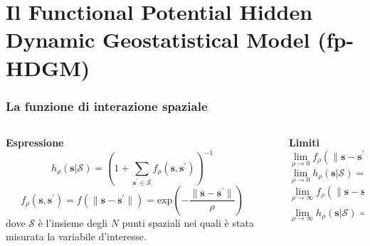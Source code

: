 \section[Il modello fp-HDGM]{Il Functional Potential Hidden Dynamic Geostatistical Model (fp-HDGM)}

\begin{frame}
	\frametitle{La funzione di interazione spaziale}
	\centering
	
	\begin{columns}[T]
		
		\begin{column}[t]{0.48\linewidth}
			\textbf{Espressione}
			\begin{equation*}
				h_\rho(\mathbf{s}|\mathcal{S}) = \left(1 + \sum_{\mathbf{s}^\prime\in\mathcal{S}}f_\rho(\mathbf{s}, \mathbf{s}^\prime)\right)^{-1}
			\end{equation*}
			\begin{equation*}
				f_\rho(\mathbf{s}, \mathbf{s}^\prime) = f(\| \mathbf{s} - \mathbf{s}^\prime \|) = \text{exp}\left(-\frac{\|\mathbf{s} - \mathbf{s}^\prime\|}{\rho}\right)
			\end{equation*}
			\justifying
			dove $\mathcal{S}$ è l'insieme degli $N$ punti spaziali nei quali è stata misurata la variabile d'interesse.
		\end{column}
		
		\begin{column}{.02\textwidth}
			\rule{.1mm}{0.7\textheight}
		\end{column}
	
		\begin{column}[t]{0.48\linewidth}
			\textbf{Limiti}
			\begin{equation*}
				\lim\limits_{\rho\to 0} f_\rho(\| \mathbf{s} - \mathbf{s}^\prime \|) = 0
			\end{equation*}
			\begin{equation*}
				\lim\limits_{\rho\to 0} h_\rho(\mathbf{s}|\mathcal{S}) = 1
			\end{equation*}
			\begin{equation*}
				\lim\limits_{\rho\to\infty} f_\rho(\| \mathbf{s} - \mathbf{s}^\prime \|) = 1
			\end{equation*}
			\begin{equation*}
				\lim\limits_{\rho\to\infty} h_\rho(\mathbf{s}|\mathcal{S}) = \frac{1}{N+1}
			\end{equation*}
		\end{column}
	\end{columns}
\end{frame}

